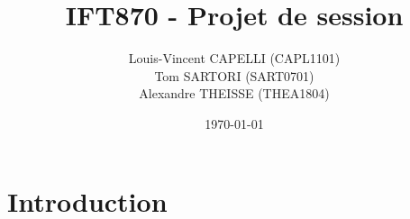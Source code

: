 \documentclass[12pt]{iEEEtran}
\title{IFT870 - Projet de session}
\author{Louis-Vincent CAPELLI (CAPL1101) \\ 
        Tom SARTORI (SART0701) \\
        Alexandre THEISSE (THEA1804)}
\date{\today}
\begin{document}
\maketitle













\section{Introduction}
\end{document}
